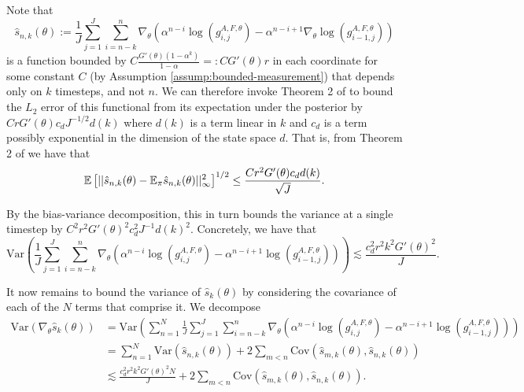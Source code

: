 \documentclass{article}
\begin{document}
Note that $$\hat s_{n,k}(\theta) := \frac{1}{J}\sum_{j=1}^J\sum_{i=n-k}^n \nabla_\theta\left(\alpha^{n-i} \log\left(g_{i,j}^{A,F,\theta}\right)- \alpha^{n-i+1} \nabla_\theta \log\left(g_{i-1,j}^{A,F,\theta}\right)\right)$$ is a function bounded by $C\frac{G'(\theta)(1-\alpha^k)}{1-\alpha} =: CG'(\theta)r$ in each coordinate for some constant $C$ (by Assumption \ref{assump:bounded-measurement}) that depends only on $k$ timesteps, and not $n$. We can therefore invoke Theorem 2 of \cite{delMoral03} to bound the $L_2$ error of this functional from its expectation under the posterior by $CrG'(\theta)c_dJ^{-1/2}d(k)$ where $d(k)$ is a term linear in $k$ and $c_d$ is a term possibly exponential in the dimension of the state space $d$. That is, from Theorem 2 of \cite{delMoral03} we have that
$$\mathbb{E}\left[||\hat s_{n,k}(\theta) - \mathbb{E}_{\pi}\hat s_{n,k}(\theta)||_\infty^2\right]^{1/2} \leq \frac{Cr^2G'(\theta)c_dd(k)}{\sqrt{J}}.$$


By the bias-variance decomposition, this in turn bounds the variance at a single timestep by $C^2r^2G'(\theta)^2c_d^2J^{-1}d(k)^2$. Concretely, we have that
$$\text{Var}\left(\frac{1}{J}\sum_{j=1}^J\sum_{i=n-k}^n \nabla_\theta\left(\alpha^{n-i} \log\left(g_{i,j}^{A,F,\theta}\right)- \alpha^{n-i+1} \log\left(g_{i-1,j}^{A,F,\theta}\right)\right)\right) \lesssim \frac{c_d^2r^2k^2G'(\theta)^2}{J}.$$

It now remains to bound the variance of $\hat s_k(\theta)$ by considering the covariance of each of the $N$ terms that comprise it. We decompose
\begin{align*}
    \text{Var}(\nabla_\theta \hat s_k(\theta)) &= \text{Var}\left(\sum_{n=1}^N \frac{1}{J}\sum_{j=1}^J\sum_{i=n-k}^n \nabla_\theta\left(\alpha^{n-i} \log\left(g_{i,j}^{A,F,\theta}\right)- \alpha^{n-i+1} \log\left(g_{i-1,j}^{A,F,\theta}\right)\right)\right) \\
    &= \sum_{n=1}^N\text{Var}\left(\hat s_{n,k}(\theta)\right)+ 2\sum_{m<n}\text{Cov}\left(\hat s_{m,k}(\theta), \hat s_{n,k}(\theta)\right) \\
    &\lesssim \frac{c_d^2r^2k^2G'(\theta)^2N}{J} + 2\sum_{m<n}\text{Cov}\left(\hat s_{m,k}(\theta), \hat s_{n,k}(\theta)\right).
\end{align*}
\end{document}
